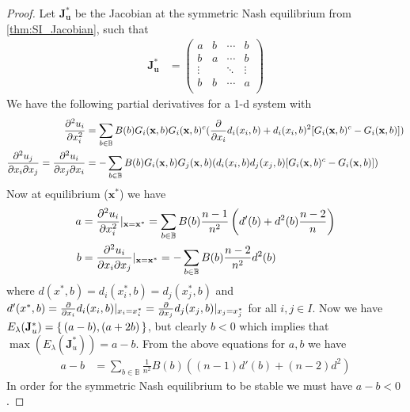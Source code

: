 \documentclass{article}
\newcommand {\B}{\mathbb{B}}
\begin{document}
                \begin{proof}
                    Let $\mathbf{J}_\mathbf{u}^*$ be the Jacobian at the symmetric Nash equilibrium from \cref{thm:SI_Jacobian}, such that 
                    \begin{align}
                    \mathbf{J}_{\mathbf{u}}^*&=
                        \begin{pmatrix}
                            a & b& \cdots & b \\ %
                            b & a & \cdots & b \\ %
                            \vdots &  & \ddots &\vdots  \\ %
                            b & b & \cdots & a \\ %
                        \end{pmatrix}
                    \end{align}
                    We have the following partial derivatives for a 1-d system with 
                    \begin{align}
                        \pdv[2]{u_{i}}{x_{i}}&=\sum_{b\in \B} B(b)G_{i}(\mathbf{x},b)G_{i}(\mathbf{x},b)^c(\pdv{}{x_i}d_i(x_i,b)+d_i(x_i,b)^2[G_{i}(\mathbf{x},b)^c-G_{i}(\mathbf{x},b)]) \\ %
                        \pdv[]{u_{j}}{x_{i}}{x_{j}}=\pdv[]{u_{i}}{x_{j}}{x_{i}}&=-\sum_{b\in \B} B(b)G_{i}(\mathbf{x},b)G_{j}(\mathbf{x},b)(d_i(x_i,b)d_{j}(x_j,b)[G_{i}(\mathbf{x},b)^c-G_{i}(\mathbf{x},b)])
                    \end{align}
                    Now at equilibrium ($\mathbf{x}^*$) we have
                    \begin{align}
                        a&=\pdv[2]{u_{i}}{x_{i}}|_{\mathbf{x}=\mathbf{x}^*}=\sum_{b\in \B} B(b)\frac{n-1}{n^2}\left(d'(b)+d^2(b)\frac{n-2}{n}\right) \\ %
                        b&=\pdv[]{u_{i}}{x_{i}}{x_{j}}|_{\mathbf{x}=\mathbf{x}^*}=-\sum_{b\in \B} B(b)\frac{n-2}{n^2}d^2(b)
                    \end{align}
                    where $d(x^*,b)=d_i(x_i^*,b)=d_j(x_j^*,b)$ and $d'(x^*,b)=\pdv{}{x_i}d_i(x_i,b)|_{x_i=x_i^*}=\pdv{}{x_j}d_j(x_j,b)|_{x_j=x_j^*}$ for all $i,j\in I$. Now we have $E_{\lambda}(\mathbf{J}_{u}^*)=\set{(a-b),(a+2b)}$, but clearly $b<0$ which implies that $\max(E_{\lambda}(\mathbf{J}_{u}^{*}))=a-b$. From the above equations for $a,b$ we have 
                    \begin{align}
                        a-b&=\sum_{b\in \B}\frac{1}{n^2}B(b)((n-1)d'(b)+(n-2)d^2)
                    \end{align}
                    In order for the symmetric Nash equilibrium to be stable we must have $a-b<0$. 
                \end{proof}
                
\end{document}
